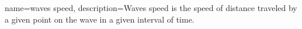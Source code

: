  {
    name=waves speed,
    description={Waves speed is the speed of distance traveled by a given point on the wave in a given interval of time.}
}
